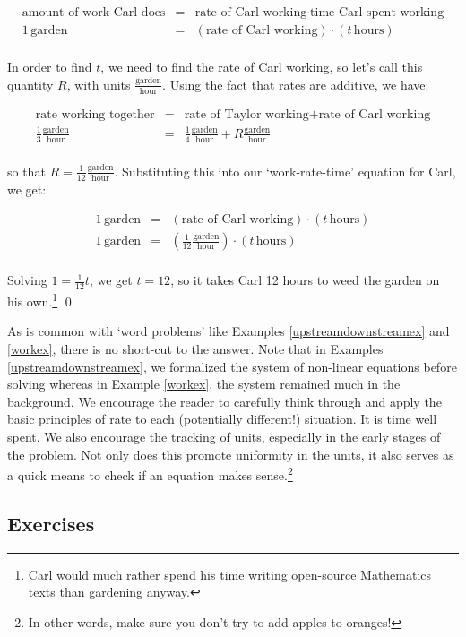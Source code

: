 \begin{ex}
\[ \begin{array}{rcl}

\text{amount of work Carl does} & = & \text{rate of Carl working} \cdot \text{time Carl spent working} \\

1 \, \text{garden} & = & (\text{rate of Carl working}) \cdot (t \, \text{hours}) \\ \end{array} \]

In order to find $t$, we need to find the rate of Carl working, so let's call this quantity $R$, with units $\frac{\text{garden}}{\text{hour}}$.  Using the fact that rates are additive, we have:

\[ \begin{array}{rcl}

\text{rate working together} & = & \text{rate of Taylor working} + \text{rate of Carl working} \\ [5pt]

\frac{1}{3} \frac{\text{garden}}{\text{hour}} & = & \frac{1}{4} \frac{\text{garden}}{\text{hour}} + R \frac{\text{garden}}{\text{hour}} \\ \end{array} \]

so that $R = \frac{1}{12} \frac{\text{garden}}{\text{hour}}$.  Substituting this into our `work-rate-time' equation for Carl, we get:

\[ \begin{array}{rcl}

1 \, \text{garden} & = & (\text{rate of Carl working}) \cdot (t \, \text{hours}) \\ [5pt] 

1 \, \text{garden} & = & \left(\frac{1}{12} \frac{\text{garden}}{\text{hour}} \right) \cdot (t \, \text{hours}) \\ \end{array} \]

Solving $1 = \frac{1}{12} t$, we get $t = 12$, so it takes Carl 12 hours to weed the garden on his own.\footnote{Carl would much rather spend his time writing open-source Mathematics texts than gardening anyway.} \qed

\end{ex}

As is common with `word problems' like Examples \ref{upstreamdownstreamex} and \ref{workex}, there is no short-cut to the answer.  Note that in  Examples \ref{upstreamdownstreamex}, we formalized the system of non-linear equations before solving whereas in Example \ref{workex}, the system remained much in the background.  We encourage the reader to carefully think through and apply the basic principles of rate to each (potentially different!) situation.  It is time well spent.  We also encourage the tracking of units, especially in the early stages of the problem.  Not only does this promote uniformity in the units, it also serves as a quick means to check if an equation makes sense.\footnote{In other words, make sure you don't try to add apples to oranges!}

\newpage

\subsection{Exercises}


\closegraphsfile